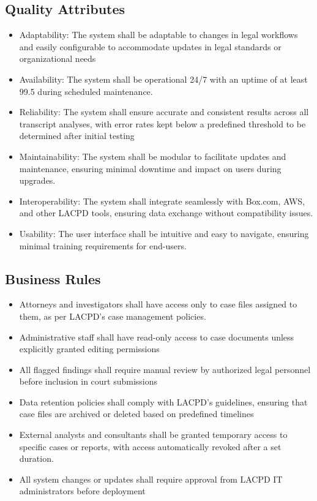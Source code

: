 \documentclass[12pt]{article}
\begin{document}
\subsection{Quality Attributes}
\begin{itemize}
  \item Adaptability: The system shall be adaptable to changes in legal workflows and easily
 configurable to accommodate updates in legal standards or organizational needs
  \item Availability: The system shall be operational 24/7 with an uptime of at least 99.5%
 during scheduled maintenance.
\item  Reliability: The system shall ensure accurate and consistent results across all transcript
 analyses, with error rates kept below a predefined threshold to be determined after initial
 testing
\item Maintainability: The system shall be modular to facilitate updates and maintenance,
 ensuring minimal downtime and impact on users during upgrades.
\item  Interoperability: The system shall integrate seamlessly with Box.com, AWS, and other
 LACPD tools, ensuring data exchange without compatibility issues.
\item  Usability: The user interface shall be intuitive and easy to navigate, ensuring minimal
 training requirements for end-users.
\end{itemize}

\subsection{Business Rules}
\begin{itemize}
  \item Attorneys and investigators shall have access only to case files assigned to them, as per
 LACPD’s case management policies.
  \item Administrative staff shall have read-only access to case documents unless explicitly granted
 editing permissions
  \item All flagged findings shall require manual review by authorized legal personnel before
 inclusion in court submissions
\item Data retention policies shall comply with LACPD’s guidelines, ensuring that case files are
 archived or deleted based on predefined timelines
\item  External analysts and consultants shall be granted temporary access to specific cases or
 reports, with access automatically revoked after a set duration.
\item All system changes or updates shall require approval from LACPD IT administrators before
 deployment
\end{itemize}
\end{document}
